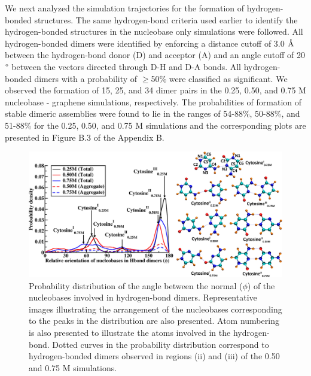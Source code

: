 We next analyzed the simulation trajectories for the formation of hydrogen-bonded structures. The same hydrogen-bond criteria used earlier to identify the hydrogen-bonded structures in the nucleobase only simulations were followed. All hydrogen-bonded dimers were identified by enforcing a distance cutoff of 3.0 $\text{\normalfont\AA}$ between the hydrogen-bond donor (D) and acceptor (A) and an angle cutoff of 20$\degree$ between the vectors directed through D-H and D-A bonds.  All hydrogen-bonded dimers with a probability of $\geq$50\% were classified as significant. We observed the formation of 15, 25, and 34 dimer pairs in the 0.25, 0.50, and 0.75 M nucleobase - graphene simulations, respectively. The probabilities of formation of stable dimeric assemblies were found to lie in the ranges of 54-88\%, 50-88\%, and 51-88\% for the 0.25, 0.50, and 0.75 M simulations and the corresponding plots are presented in Figure B.3 of the Appendix B. 
\begin{figure}
    \centering
    \includegraphics[width=\textwidth]{Chapter2/Figures/Figure5.png}
    \caption[Probability distribution of the angle between the normal ($\phi$) of the nucleobases involved in hydrogen-bond dimers. Representative images illustrating the arrangement of the nucleobases corresponding to the peaks in the distribution are also presented]{Probability distribution of the angle between the normal ($\phi$) of the nucleobases involved in hydrogen-bond dimers. Representative images illustrating the arrangement of the nucleobases corresponding to the peaks in the distribution are also presented. Atom numbering is also presented to illustrate the atoms involved in the hydrogen-bond. Dotted curves in the probability distribution correspond to hydrogen-bonded dimers observed in regions (ii) and (iii) of the 0.50 and 0.75 M simulations.}
\end{figure}

